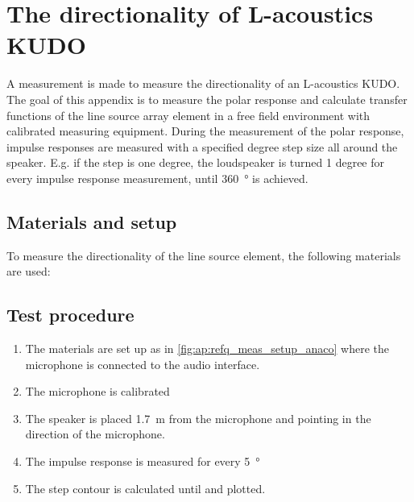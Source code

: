 \chapter{The directionality of L-acoustics KUDO}\label{ap:dir_of_kudo}
A measurement is made to measure the directionality of an L-acoustics KUDO.  The goal of this appendix is to measure the polar response and calculate transfer functions of the line source array element in a free field environment with calibrated measuring equipment. During the measurement of the polar response, impulse responses are measured with a specified degree step size all around the speaker. E.g. if the step is one degree, the loudspeaker is turned 1 degree for every impulse response measurement, until \SI{360}{\degree} is achieved.


\section*{Materials and setup}
To measure the directionality of the line source element, the following materials are used:

\startequipment
{}
\stopequipment




\section*{Test procedure}


\begin{enumerate}
\item The materials are set up as in \autoref{fig:ap:refq_meas_setup_anaco} where the  microphone is connected to the audio interface.
\item The microphone is calibrated
\item The speaker is placed \SI{1.7}{\meter} from the microphone and pointing in the direction of the microphone.
\item    The impulse response is measured for every \SI{5}{\degree}
\item The  step contour is calculated until  and plotted.
\end{enumerate}


